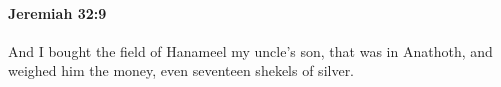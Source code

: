 
		\paragraph{Jeremiah 32:9} %
			\label{JEREMIAH-32-9}

			And I bought the field of Hanameel my uncle’s son, that was in Anathoth, and weighed him the money, even seventeen shekels of silver.


